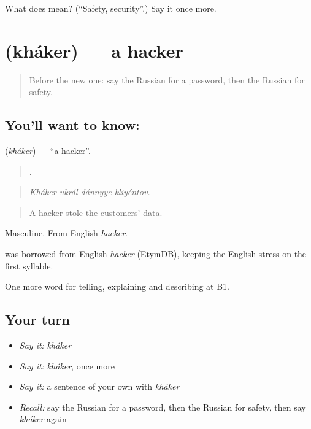 \begin{tcolorbox}[breakable,colback=teal!4,colframe=teal!35!black,title={Before you move on}]
What does  mean? (\textquotedblleft{}Safety, security\textquotedblright{}.) Say it once more.
\end{tcolorbox}
\section[\texorpdfstring{\ru{хакер} (kháker)}{хакер (kháker)}]{ (kháker) — a hacker}

\label{lesson:RU-C400-khaker}



\begin{quote}
Before the new one: say the Russian for a password, then the Russian for safety.
\end{quote}

\subsection*{You'll want to know: }
\textbf{} (\emph{kháker}) — \textquotedblleft{}a hacker\textquotedblright{}.

\begin{quote}
   .
\end{quote}

\begin{quote}
\emph{Kháker ukrál dánnyye kliyéntov.}
\end{quote}

\begin{quote}
A hacker stole the customers’ data.
\end{quote}

Masculine. From English \emph{hacker}.

\begin{cousinweb}
\textbf{} was borrowed from English \emph{hacker} (EtymDB), keeping the English stress on the first syllable.
\end{cousinweb}

\begin{grammarlens}[title={What you've built}]
One more word for telling, explaining and describing at B1.
\end{grammarlens}

\subsection*{Your turn}
\begin{itemize}
\raggedright
  \item \emph{Say it:} \emph{kháker}
  \item \emph{Say it:} \emph{kháker}, once more
  \item \emph{Say it:} a sentence of your own with \emph{kháker}
  \item \emph{Recall:} say the Russian for a password, then the Russian for safety, then say \emph{kháker} again
\end{itemize}

